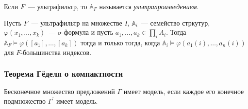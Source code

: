     Если $F$~— ультрафильтр, то $\mathbb{A}_{F}$ называется \textit{ультрапроизведением}.


\begin{theorem}[об ультрапроизведениях]
    Пусть $F$~— ультрафильтр на множестве $I$, $\mathbb{A}_i$~— семейство стркутур, $\varphi(x_1, \ldots, x_k)$~— $\sigma$-формула и пусть $a_1, \ldots, a_k \in \prod_i A_i$. Тогда $\mathbb{A}_F \models \varphi([a_1], \ldots, [a_k])$ тогда и только тогда, когда $\mathbb{A}_i \models \varphi(a_1(i), \ldots, a_n(i))$ для $F$-большинства индексов.
\end{theorem} 

\subsubsection{Теорема Гёделя о компактности} 

\begin{theorem}
    Бесконечное множество предложений $\Gamma$ имеет модель, если каждое его конечное подмножество $\Gamma^\prime$ имеет модель.
\end{theorem}



